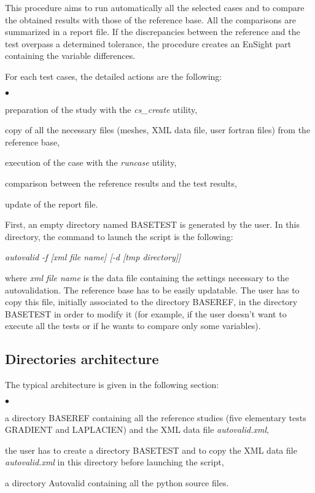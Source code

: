 This procedure aims to run automatically all the selected cases and to
compare the obtained results with those of the reference base. All the
comparisons are summarized in a report file.
If the discrepancies between the reference and the test overpass a
determined tolerance, the procedure creates an EnSight part containing
the variable differences.

For each test cases, the detailed actions are the following:
\begin{list}{$\bullet$}{}
\item preparation of the study with the {\it cs\_create} utility,
\item copy of all the necessary files (meshes, XML data file, user
      fortran files) from the reference base,
\item execution of the case with the {\it runcase} utility,
\item comparison between the reference results and the test results,
\item update of the report file.
\end{list}

First, an empty directory named BASETEST is generated by the user.
In this directory, the command to launch the script is the following:
\begin{center}
{\it autovalid -f [xml file name] [-d [tmp directory]] }
\end{center}
where {\it xml file name} is the data file containing the settings
necessary to the autovalidation. The reference base has to be easily
updatable. The user has to copy this file, initially associated to the
directory BASEREF, in the directory BASETEST in order to modify it (for
example, if the user doesn't want to execute all the tests or if he
wants to compare only some variables).


\subsection{Directories architecture}

The typical architecture is given in the following section:

\begin{list}{$\bullet$}{}
\item a directory BASEREF containing all the reference studies
      (five elementary tests GRADIENT and LAPLACIEN) and the XML data
      file {\it autovalid.xml},
\item the user has to create a directory BASETEST and to copy
      the XML data file {\it autovalid.xml} in this directory before
      launching the script,
\item a directory Autovalid containing all the python source files.
\end{list}



